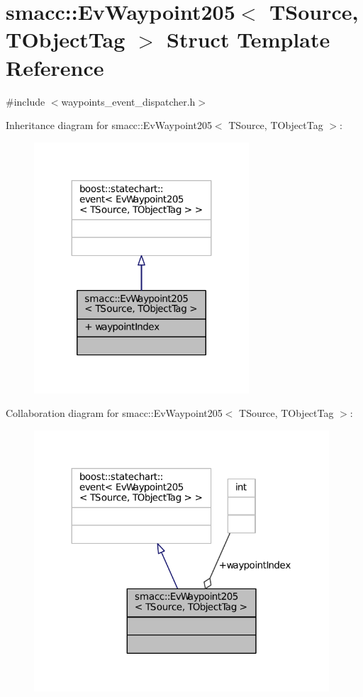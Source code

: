 \hypertarget{structsmacc_1_1EvWaypoint205}{}\section{smacc\+:\+:Ev\+Waypoint205$<$ T\+Source, T\+Object\+Tag $>$ Struct Template Reference}
\label{structsmacc_1_1EvWaypoint205}


{\ttfamily \#include $<$waypoints\+\_\+event\+\_\+dispatcher.\+h$>$}



Inheritance diagram for smacc\+:\+:Ev\+Waypoint205$<$ T\+Source, T\+Object\+Tag $>$\+:
\nopagebreak
\begin{figure}[H]
\begin{center}
\leavevmode
\includegraphics[width=227pt]{structsmacc_1_1EvWaypoint205__inherit__graph}
\end{center}
\end{figure}


Collaboration diagram for smacc\+:\+:Ev\+Waypoint205$<$ T\+Source, T\+Object\+Tag $>$\+:
\nopagebreak
\begin{figure}[H]
\begin{center}
\leavevmode
\includegraphics[width=312pt]{structsmacc_1_1EvWaypoint205__coll__graph}
\end{center}
\end{figure}
